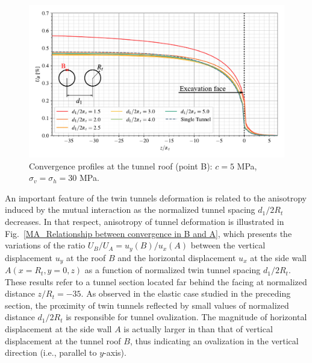 \documentclass[a4paper,fleqn]{cas-sc}
\begin{document}
\begin{figure}[h!]
	\centering
	\includegraphics[scale=0.65]{MA_Convergence Profiles in B.pdf}
	\caption{Convergence profiles at the tunnel roof (point B): $c=5$ MPa, $\sigma_v = \sigma_h = 30$ MPa.}
	\label{MA_convergence_profile_B}
\end{figure}
\FloatBarrier

An important feature of the twin tunnels deformation is related to the anisotropy induced by the mutual interaction as the normalized tunnel spacing $d_1/2R_t$ decreases. In that respect, anisotropy of tunnel deformation is illustrated in Fig.~\ref{MA_Relationship between convergence in B and A}, which presents the variations of the ratio $U_B/U_A = u_y(B)/u_x(A)$ between the vertical displacement $u_y$ at the roof $B$ and the horizontal displacement $u_x$ at the side wall $A(x = R_t, y = 0, z)$ as a function of  normalized twin tunnel spacing $d_1/2R_t$. These results refer to a tunnel section located far behind the facing at normalized distance $z/R_t = -35$. As observed in the elastic case studied in the preceding section, the proximity of twin tunnels reflected by small values of normalized distance $d_1/2R_t$ is responsible for tunnel ovalization. The magnitude of horizontal displacement at the side wall $A$ is actually larger in than that of vertical displacement at the tunnel roof $B$, thus indicating an ovalization in the vertical direction (i.e., parallel to $y$-axis).
\end{document}
